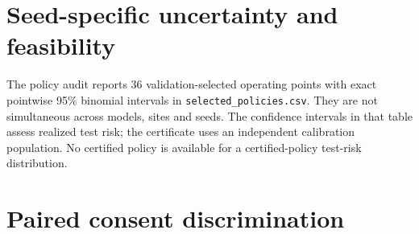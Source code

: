 \section*{Seed-specific uncertainty and feasibility}




The policy audit reports 36 validation-selected operating points with exact pointwise 95\% binomial intervals in \texttt{selected\_policies.csv}. They are not simultaneous across models, sites and seeds. The confidence intervals in that table assess realized test risk; the certificate uses an independent calibration population. No certified policy is available for a certified-policy test-risk distribution.

\section*{Paired consent discrimination}

